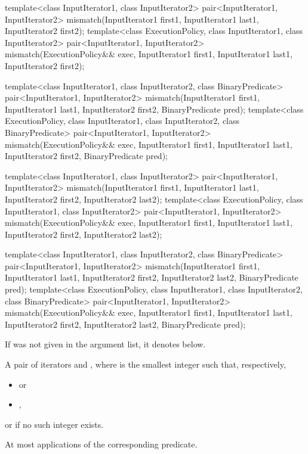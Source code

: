 %
\begin{itemdecl}
template<class InputIterator1, class InputIterator2>
  pair<InputIterator1, InputIterator2>
      mismatch(InputIterator1 first1, InputIterator1 last1,
               InputIterator2 first2);
template<class ExecutionPolicy, class InputIterator1, class InputIterator2>
  pair<InputIterator1, InputIterator2>
    mismatch(ExecutionPolicy&& exec,
             InputIterator1 first1, InputIterator1 last1,
             InputIterator2 first2);

template<class InputIterator1, class InputIterator2,
         class BinaryPredicate>
  pair<InputIterator1, InputIterator2>
      mismatch(InputIterator1 first1, InputIterator1 last1,
               InputIterator2 first2, BinaryPredicate pred);
template<class ExecutionPolicy, class InputIterator1, class InputIterator2,
         class BinaryPredicate>
  pair<InputIterator1, InputIterator2>
    mismatch(ExecutionPolicy&& exec,
             InputIterator1 first1, InputIterator1 last1,
             InputIterator2 first2, BinaryPredicate pred);

template<class InputIterator1, class InputIterator2>
  pair<InputIterator1, InputIterator2>
    mismatch(InputIterator1 first1, InputIterator1 last1,
             InputIterator2 first2, InputIterator2 last2);
template<class ExecutionPolicy, class InputIterator1, class InputIterator2>
  pair<InputIterator1, InputIterator2>
    mismatch(ExecutionPolicy&& exec,
             InputIterator1 first1, InputIterator1 last1,
             InputIterator2 first2, InputIterator2 last2);

template<class InputIterator1, class InputIterator2,
         class BinaryPredicate>
  pair<InputIterator1, InputIterator2>
    mismatch(InputIterator1 first1, InputIterator1 last1,
             InputIterator2 first2, InputIterator2 last2,
             BinaryPredicate pred);
template<class ExecutionPolicy, class InputIterator1, class InputIterator2,
         class BinaryPredicate>
  pair<InputIterator1, InputIterator2>
    mismatch(ExecutionPolicy&& exec,
             InputIterator1 first1, InputIterator1 last1,
             InputIterator2 first2, InputIterator2 last2,
             BinaryPredicate pred);
\end{itemdecl}

\begin{itemdescr}
\pnum
\remarks If  was not given in the argument list, it denotes
 below.

\pnum
\returns
A pair of iterators  and
, where  is the smallest integer
such that, respectively,
\begin{itemize}
\item {} or
\item {},
\end{itemize}
or  if no such integer exists.

\pnum
\complexity
At most
applications of the corresponding predicate.
\end{itemdescr}

